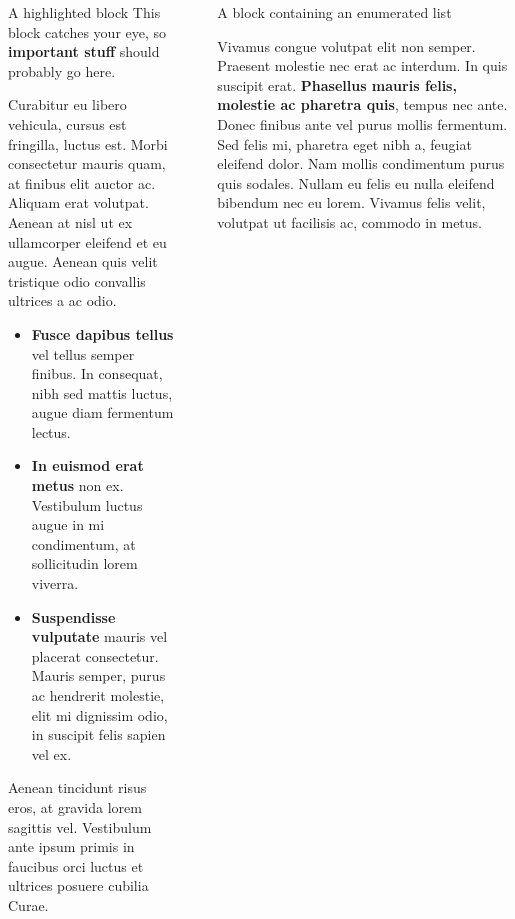 \documentclass[final]{beamer}
\newlength{\sepwidth}
\newlength{\colwidth}
\newcommand{\separatorcolumn}{\begin{column}{\sepwidth}\end{column}}
\begin{document}
\begin{frame}[t]
\begin{columns}[t]
\begin{column}{\colwidth}
\begin{alertblock}{A highlighted block}
					This block catches your eye, so \textbf{important stuff} should probably go
					here.
					
					Curabitur eu libero vehicula, cursus est fringilla, luctus est. Morbi
					consectetur mauris quam, at finibus elit auctor ac. Aliquam erat volutpat.
					Aenean at nisl ut ex ullamcorper eleifend et eu augue. Aenean quis velit
					tristique odio convallis ultrices a ac odio.
					
					\begin{itemize}
						\item \textbf{Fusce dapibus tellus} vel tellus semper finibus. In
						consequat, nibh sed mattis luctus, augue diam fermentum lectus.
						\item \textbf{In euismod erat metus} non ex. Vestibulum luctus augue in
						mi condimentum, at sollicitudin lorem viverra.
						\item \textbf{Suspendisse vulputate} mauris vel placerat consectetur.
						Mauris semper, purus ac hendrerit molestie, elit mi dignissim odio, in
						suscipit felis sapien vel ex.
					\end{itemize}
					
					Aenean tincidunt risus eros, at gravida lorem sagittis vel. Vestibulum ante
					ipsum primis in faucibus orci luctus et ultrices posuere cubilia Curae.
					
				\end{alertblock}
				
			\end{column}
			
			\separatorcolumn
			
			\begin{column}{\colwidth}
				
				\begin{block}{A block containing an enumerated list}
					
					Vivamus congue volutpat elit non semper. Praesent molestie nec erat ac
					interdum. In quis suscipit erat. \textbf{Phasellus mauris felis, molestie
						ac pharetra quis}, tempus nec ante. Donec finibus ante vel purus mollis
					fermentum. Sed felis mi, pharetra eget nibh a, feugiat eleifend dolor. Nam
					mollis condimentum purus quis sodales. Nullam eu felis eu nulla eleifend
					bibendum nec eu lorem. Vivamus felis velit, volutpat ut facilisis ac,
					commodo in metus.
					

\end{block}
\end{column}
\end{columns}
\end{frame}
\end{document}
